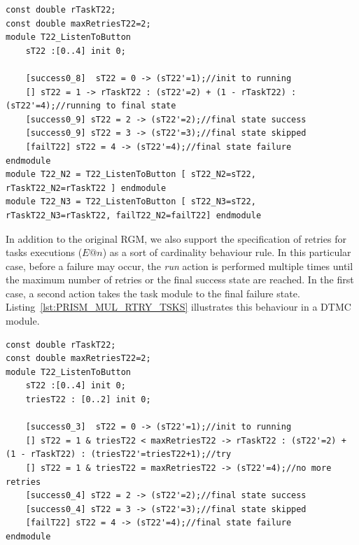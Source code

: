 \begin{lstlisting}[language=Prism, caption={Interleaved cardinality with n=3 for task T22.},label={lst:PRISM_MUL_INT_TSKS}] 
const double rTaskT22;
const double maxRetriesT22=2;
module T22_ListenToButton
	sT22 :[0..4] init 0;
	
	[success0_8]  sT22 = 0 -> (sT22'=1);//init to running
	[] sT22 = 1 -> rTaskT22 : (sT22'=2) + (1 - rTaskT22) : (sT22'=4);//running to final state
	[success0_9] sT22 = 2 -> (sT22'=2);//final state success
	[success0_9] sT22 = 3 -> (sT22'=3);//final state skipped
	[failT22] sT22 = 4 -> (sT22'=4);//final state failure
endmodule
module T22_N2 = T22_ListenToButton [ sT22_N2=sT22, rTaskT22_N2=rTaskT22 ] endmodule
module T22_N3 = T22_ListenToButton [ sT22_N3=sT22, rTaskT22_N3=rTaskT22, failT22_N2=failT22] endmodule
\end{lstlisting}


In addition to the original RGM, we also support the specification of retries for tasks executions ($E@n$) as a sort of cardinality behaviour rule. In this particular case, before a failure may occur, the \textit{run} action is performed multiple times until the maximum number of retries or the final success state are reached. In the first case, a second action takes the task module to the final failure state. Listing~\ref{lst:PRISM_MUL_RTRY_TSKS} illustrates this behaviour in a DTMC module.

\begin{lstlisting}[language=Prism, caption={Retry behaviour with n=2 for task T22.},label={lst:PRISM_MUL_RTRY_TSKS}] 
const double rTaskT22;
const double maxRetriesT22=2;
module T22_ListenToButton
	sT22 :[0..4] init 0;
	triesT22 : [0..2] init 0;	
	
	[success0_3]  sT22 = 0 -> (sT22'=1);//init to running
	[] sT22 = 1 & triesT22 < maxRetriesT22 -> rTaskT22 : (sT22'=2) + (1 - rTaskT22) : (triesT22'=triesT22+1);//try
	[] sT22 = 1 & triesT22 = maxRetriesT22 -> (sT22'=4);//no more retries
	[success0_4] sT22 = 2 -> (sT22'=2);//final state success
	[success0_4] sT22 = 3 -> (sT22'=3);//final state skipped
	[failT22] sT22 = 4 -> (sT22'=4);//final state failure
endmodule
\end{lstlisting}


